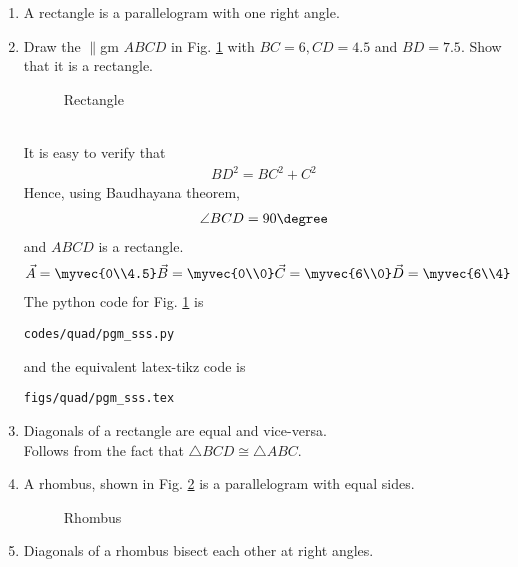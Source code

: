 \begin{enumerate}[label=\arabic*.,ref=\thesubsection.\theenumi]
\item A rectangle is a parallelogram with one right angle.
\item Draw the $\parallel$gm $ABCD$ in 	Fig. \ref{fig:pgm_sss}	
with $BC = 6, CD = 4.5$ and $BD=7.5$.  Show that it is a rectangle.
\label{const:pgm_sss}
%
\begin{figure}[!ht]
	\begin{center}
		\resizebox{\columnwidth}{!}{}
	\end{center}
	\caption{Rectangle}
	\label{fig:pgm_sss}	
\end{figure}
\\
\solution It is easy to verify that 
%
\begin{align}
BD^2=BC^2+C^2
\end{align}
%
Hence, using Baudhayana theorem, 
%
\begin{align}
\angle BCD = 90\degree
\end{align}
%
and  $ABCD$ is a rectangle.
\begin{align}
\vec{A} = \myvec{0\\4.5}
\vec{B} = \myvec{0\\0}
\vec{C} = \myvec{6\\0}
\vec{D} = \myvec{6\\4}
\end{align}
%
The python code for  Fig. \ref{fig:pgm_sss} is
\begin{lstlisting}
codes/quad/pgm_sss.py
\end{lstlisting}
%
and the equivalent latex-tikz code is
%
\begin{lstlisting}
figs/quad/pgm_sss.tex
\end{lstlisting}
%
\item  Diagonals of a rectangle are equal and vice-versa. 
\\
\solution Follows from the fact that $\triangle BCD \cong \triangle ABC$. 
%
\item A rhombus, shown in Fig. 	\ref{fig:rhom_sss}	
 is a parallelogram with equal sides.  
%
\begin{figure}[!ht]
	\begin{center}
		\resizebox{\columnwidth}{!}{}
	\end{center}
	\caption{Rhombus}
	\label{fig:rhom_sss}	
\end{figure}
%
\item Diagonals of a rhombus bisect each other at right angles.

\end{enumerate}
